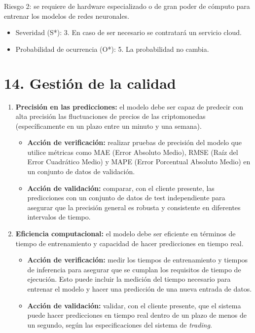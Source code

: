 \documentclass[
    11pt, %
]{charter}
\begin{document}
        Riesgo 2: se requiere de hardware especializado o de gran poder de cómputo para entrenar los modelos de redes neuronales.
        \begin{itemize}
        \item Severidad (S*): 3.
          En caso de ser necesario se contratará un servicio cloud.
        \item Probabilidad de ocurrencia (O*): 5.
          La probabilidad no cambia.
        \end{itemize}

    \newpage
    \section{14. Gestión de la calidad}
    \label{sec:calidad}
    \begin{enumerate}
    \item \textbf{Precisión en las predicciones:} el modelo debe ser capaz de predecir con alta precisión las fluctuaciones de precios de las criptomonedas (específicamente en un plazo entre un minuto y una semana).
      \begin{itemize}
      \item \textbf{Acción de verificación:} realizar pruebas de precisión del modelo que utilice métricas como MAE (Error Absoluto Medio), RMSE (Raíz del Error Cuadrático Medio) y MAPE (Error Porcentual Absoluto Medio) en un conjunto de datos de validación.
      \item \textbf{Acción de validación:} comparar, con el cliente presente, las predicciones con un conjunto de datos de test independiente para asegurar que la precisión general es robusta y consistente en diferentes intervalos de tiempo.
      \end{itemize}

    \item \textbf{Eficiencia computacional:} el modelo debe ser eficiente en términos de tiempo de entrenamiento y capacidad de hacer predicciones en tiempo real.
      \begin{itemize}
      \item \textbf{Acción de verificación:} medir los tiempos de entrenamiento y tiempos de inferencia para asegurar que se cumplan los requisitos de tiempo de ejecución. Esto puede incluir la medición del tiempo necesario para entrenar el modelo y hacer una predicción de una nueva entrada de datos.
      \item \textbf{Acción de validación:} validar, con el cliente presente, que el sistema puede hacer predicciones en tiempo real dentro de un plazo de menos de un segundo, según las especificaciones del sistema de \textit{trading}.
      \end{itemize}


\end{enumerate}
\end{document}
